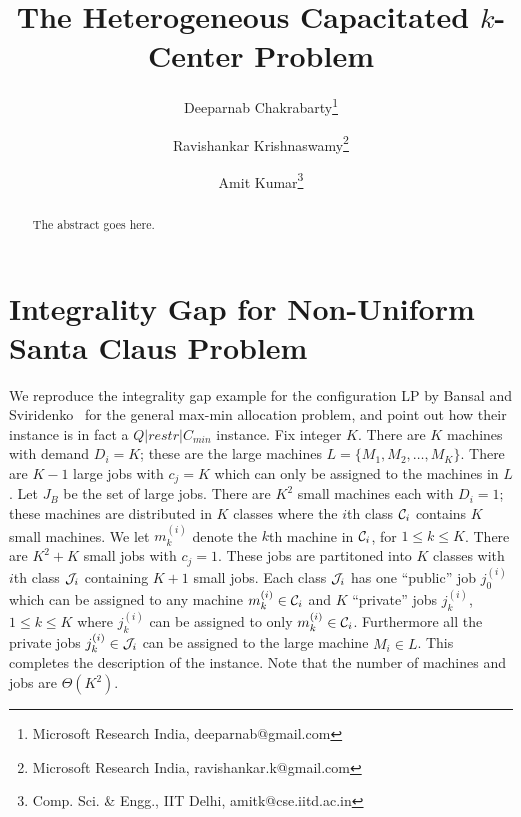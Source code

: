 \documentclass{llncs}
\begin{document}
\title{\huge The Heterogeneous Capacitated $k$-Center Problem}
\date{}
\author{Deeparnab Chakrabarty\thanks{Microsoft Research India, deeparnab@gmail.com} \and Ravishankar Krishnaswamy\thanks{Microsoft Research India, ravishankar.k@gmail.com} \and Amit Kumar\thanks{Comp. Sci. \& Engg., IIT Delhi, amitk@cse.iitd.ac.in}}
\institute{}
\maketitle
\begin{abstract}
	The abstract goes here.
\end{abstract}











\appendix
\section{Integrality Gap for Non-Uniform Santa Claus Problem}\label{sec:app-bsig}
We reproduce the integrality gap example for the configuration LP by Bansal and Sviridenko~\cite{BansalS06} for the general max-min allocation problem, and point out how their instance is in fact a $Q|restr|C_{min}$ instance.
Fix integer $K$. There are $K$ machines with demand $D_i = K$; these are the large machines $L = \{M_1,M_2,\ldots,M_K\}$. There are $K-1$ large jobs with $c_j = K$ which can only be assigned to the machines in $L$. 
Let $J_B$ be the set of large jobs. There are $K^2$ small machines each with $D_i = 1$; these machines are distributed in $K$ classes where the $i$th class ${\cal C}_i$ contains $K$ small machines. We let $m^{(i)}_k$ denote the $k$th machine in ${\cal C}_i$, for $1\leq k\leq K$.
There are $K^2 + K$ small jobs with $c_j = 1$. These jobs are partitoned into $K$ classes with $i$th class ${\cal J}_i$ containing $K+1$ small jobs. Each class ${\cal J}_i$ has one ``public'' job $j^{(i)}_0$ which can be assigned to any machine $m^{(i)}_k \in {\cal C}_i$ 
 and $K$ ``private'' jobs $j^{(i)}_k$, $1\leq k\leq K$ where $j^{(i)}_k$ can be assigned to only $m^{(i)}_k \in {\cal C}_i$. Furthermore all the private jobs $j^{(i)}_k\in {\cal J}_i$ can be assigned to the large machine $M_i \in L$. This completes the description of the instance.
Note that the number of machines and jobs are $\Theta(K^2)$.
\end{document}
